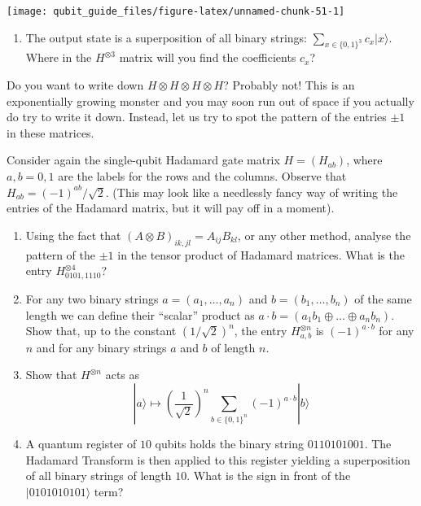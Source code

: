 \documentclass[fleqn]{article}
\providecommand{\tightlist}{%
  \setlength{\itemsep}{0pt}\setlength{\parskip}{0pt}}
\begin{document}
\begin{center}\texttt{[image: qubit\_guide\_files/figure-latex/unnamed-chunk-51-1]} \end{center}

\begin{enumerate}
\def\labelenumi{\arabic{enumi}.}
\tightlist
\item
  The output state is a superposition of all binary strings: \(\sum_{x\in\{0,1\}^3} c_x|x\rangle\).
  Where in the \(H^{\otimes 3}\) matrix will you find the coefficients \(c_x\)?
\end{enumerate}

Do you want to write down \(H\otimes H\otimes H\otimes H\)?
Probably not!
This is an exponentially growing monster and you may soon run out of space if you actually do try to write it down.
Instead, let us try to spot the pattern of the entries \(\pm1\) in these matrices.

Consider again the single-qubit Hadamard gate matrix \(H=(H_{ab})\), where \(a,b=0,1\) are the labels for the rows and the columns.
Observe that \(H_{ab}=(-1)^{ab}/\sqrt{2}\).
(This may look like a needlessly fancy way of writing the entries of the Hadamard matrix, but it will pay off in a moment).

\begin{enumerate}
\def\labelenumi{\arabic{enumi}.}
\setcounter{enumi}{1}
\item
  Using the fact that \((A\otimes B)_{ik,jl} = A_{ij}B_{kl}\), or any other method, analyse the pattern of the \(\pm1\) in the tensor product of Hadamard matrices.
  What is the entry \(H^{\otimes 4}_{0101,1110}\)?
\item
  For any two binary strings \(a=(a_1,\ldots, a_n)\) and \(b =(b_1,\ldots , b_n)\) of the same length we can define their ``scalar'' product as \(a\cdot b = (a_1b_1\oplus \ldots \oplus a_n b_n)\).
  Show that, up to the constant \((1/\sqrt{2})^n\), the entry \(H^{\otimes n}_{a,b}\) is \((-1)^{a\cdot b}\) for any \(n\) and for any binary strings \(a\) and \(b\) of length \(n\).
\item
  Show that \(H^{\otimes n}\) acts as
  \[
     |a\rangle
     \longmapsto
     \left(\frac{1}{\sqrt{2}}\right)^n
     \sum_{b\in\{0,1\}^n} (-1)^{a\cdot b}|b\rangle
   \]
\item
  A quantum register of \(10\) qubits holds the binary string \(0110101001\).
  The Hadamard Transform is then applied to this register yielding a superposition of all binary strings of length \(10\).
  What is the sign in front of the \(|0101010101\rangle\) term?
\end{enumerate}
\end{document}
